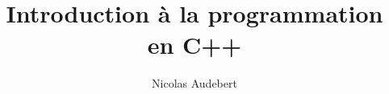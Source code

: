 \documentclass{beamer}
\begin{document}
\title[C++]{Introduction à la programmation en C++}
\author[nicolas.audebert@onera.fr]{Nicolas Audebert}
\setmainfont{Fira Sans}


\end{document}
